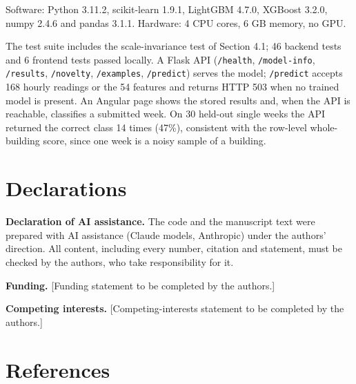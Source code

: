 \documentclass[
  10pt,
]{article}
\begin{document}
Software: Python 3.11.2, scikit-learn 1.9.1, LightGBM 4.7.0, XGBoost
3.2.0, numpy 2.4.6 and pandas 3.1.1. Hardware: 4 CPU cores, 6 GB memory,
no GPU.

The test suite includes the scale-invariance test of Section 4.1; 46
backend tests and 6 frontend tests passed locally. A Flask API
(\texttt{/health}, \texttt{/model-info}, \texttt{/results},
\texttt{/novelty}, \texttt{/examples}, \texttt{/predict}) serves the
model; \texttt{/predict} accepts 168 hourly readings or the 54 features
and returns HTTP 503 when no trained model is present. An Angular page
shows the stored results and, when the API is reachable, classifies a
submitted week. On 30 held-out single weeks the API returned the correct
class 14 times (47\%), consistent with the row-level whole-building
score, since one week is a noisy sample of a building.

\hypertarget{declarations}{%
\section{Declarations}\label{declarations}}

\textbf{Declaration of AI assistance.} The code and the manuscript text
were prepared with AI assistance (Claude models, Anthropic) under the
authors' direction. All content, including every number, citation and
statement, must be checked by the authors, who take responsibility for
it.

\textbf{Funding.} {[}Funding statement to be completed by the
authors.{]}

\textbf{Competing interests.} {[}Competing-interests statement to be
completed by the authors.{]}

\hypertarget{references}{%
\section{References}\label{references}}
\end{document}

